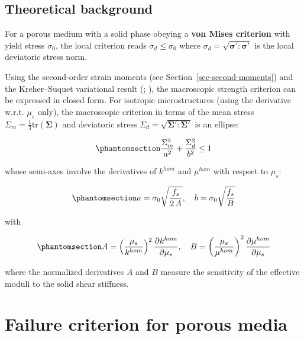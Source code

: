 \documentclass[
  a4paper,
  numbers=noendperiod,
  DIV=12]{scrreprt}
\newcommand{\uu}[1]{{\symbf{{#1}}}}
\begin{document}
\subsection{Theoretical background}\label{theoretical-background}

For a porous medium with a solid phase obeying a \textbf{von Mises
criterion} with yield stress \(\sigma_0\), the local criterion reads
\(\sigma_d \leq \sigma_0\) where
\(\sigma_d = \sqrt{\uu{\sigma}':\uu{\sigma}'}\) is the local deviatoric
stress norm.

Using the second-order strain moments (see
Section~\ref{sec-second-moments}) and the Kreher--Suquet variational
result (;
), the macroscopic strength
criterion can be expressed in closed form. For isotropic microstructures
(using the derivative w.r.t. \(\mu_s\) only), the macroscopic criterion
in terms of the mean stress
\(\Sigma_m = \tfrac{1}{3}\mathrm{tr}(\uu{\Sigma})\) and deviatoric
stress \(\Sigma_d = \sqrt{\uu{\Sigma}':\uu{\Sigma}'}\) is an ellipse:

\begin{equation}\protect\phantomsection\label{eq-strength-ellipse}{
\frac{\Sigma_m^2}{a^2} + \frac{\Sigma_d^2}{b^2} \leq 1
}\end{equation}

whose semi-axes involve the derivatives of \(k^{hom}\) and \(\mu^{hom}\)
with respect to \(\mu_s\):

\begin{equation}\protect\phantomsection\label{eq-strength-axes}{
a = \sigma_0\sqrt{\frac{f_s}{2\,A}},
\quad
b = \sigma_0\sqrt{\frac{f_s}{B}}
}\end{equation}

with

\begin{equation}\protect\phantomsection\label{eq-AB-def}{
A = \left(\frac{\mu_s}{k^{hom}}\right)^2\frac{\partial k^{hom}}{\partial \mu_s},
\quad
B = \left(\frac{\mu_s}{\mu^{hom}}\right)^2\frac{\partial \mu^{hom}}{\partial \mu_s}
}\end{equation}

where the normalized derivatives \(A\) and \(B\) measure the sensitivity
of the effective moduli to the solid shear stiffness.

\section{Failure criterion for porous
media}\label{failure-criterion-for-porous-media}
\end{document}
